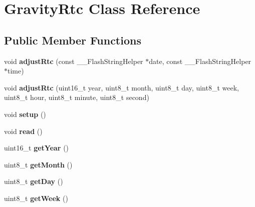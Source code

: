 \hypertarget{class_gravity_rtc}{}\section{Gravity\+Rtc Class Reference}
\label{class_gravity_rtc}
\subsection*{Public Member Functions}
\begin{DoxyCompactItemize}
\item 
void {\bfseries adjust\+Rtc} (const \+\_\+\+\_\+\+Flash\+String\+Helper $\ast$date, const \+\_\+\+\_\+\+Flash\+String\+Helper $\ast$time)\hypertarget{class_gravity_rtc_af98ba41a948771253e5e936063a817d3}{}\label{class_gravity_rtc_af98ba41a948771253e5e936063a817d3}

\item 
void {\bfseries adjust\+Rtc} (uint16\+\_\+t year, uint8\+\_\+t month, uint8\+\_\+t day, uint8\+\_\+t week, uint8\+\_\+t hour, uint8\+\_\+t minute, uint8\+\_\+t second)\hypertarget{class_gravity_rtc_afd60ca78ef607244348873630ccf9259}{}\label{class_gravity_rtc_afd60ca78ef607244348873630ccf9259}

\item 
void {\bfseries setup} ()\hypertarget{class_gravity_rtc_ac4035c99a3e51f7b643628ab885c176b}{}\label{class_gravity_rtc_ac4035c99a3e51f7b643628ab885c176b}

\item 
void {\bfseries read} ()\hypertarget{class_gravity_rtc_ab4d3d5800f67e1362502be92107cd8b9}{}\label{class_gravity_rtc_ab4d3d5800f67e1362502be92107cd8b9}

\item 
uint16\+\_\+t {\bfseries get\+Year} ()\hypertarget{class_gravity_rtc_a35c000ff428ac2c0b46d1b490532b29f}{}\label{class_gravity_rtc_a35c000ff428ac2c0b46d1b490532b29f}

\item 
uint8\+\_\+t {\bfseries get\+Month} ()\hypertarget{class_gravity_rtc_aaacf3ae5e3521206560f3a23b64030cd}{}\label{class_gravity_rtc_aaacf3ae5e3521206560f3a23b64030cd}

\item 
uint8\+\_\+t {\bfseries get\+Day} ()\hypertarget{class_gravity_rtc_adb6f74357a48f49ac0596aac3f558c7d}{}\label{class_gravity_rtc_adb6f74357a48f49ac0596aac3f558c7d}

\item 
uint8\+\_\+t {\bfseries get\+Week} ()\hypertarget{class_gravity_rtc_aa3d944f570e2906faad6ab4b1aa35372}{}\label{class_gravity_rtc_aa3d944f570e2906faad6ab4b1aa35372}


\end{DoxyCompactItemize}

